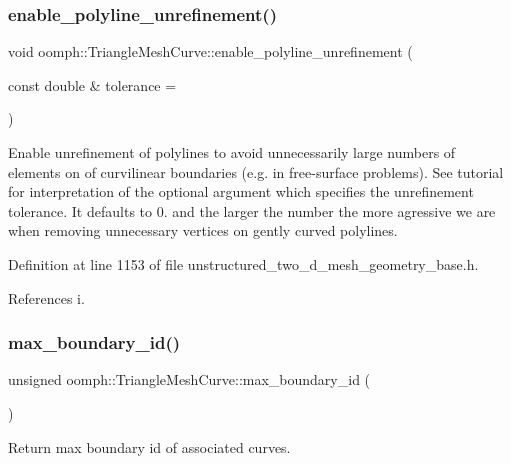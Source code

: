\subsubsection{\texorpdfstring{enable\+\_\+polyline\+\_\+unrefinement()}{enable\_polyline\_unrefinement()}}
{\footnotesize\ttfamily void oomph\+::\+Triangle\+Mesh\+Curve\+::enable\+\_\+polyline\+\_\+unrefinement (\begin{DoxyParamCaption}\item[{const double \&}]{tolerance = {} }\end{DoxyParamCaption})\hspace{0.3cm}{\ttfamily [inline]}}



Enable unrefinement of polylines to avoid unnecessarily large numbers of elements on of curvilinear boundaries (e.\+g. in free-\/surface problems). See tutorial for interpretation of the optional argument which specifies the unrefinement tolerance. It defaults to 0. and the larger the number the more agressive we are when removing unnecessary vertices on gently curved polylines. 



Definition at line 1153 of file unstructured\+\_\+two\+\_\+d\+\_\+mesh\+\_\+geometry\+\_\+base.\+h.



References i.

\mbox{\label{classoomph_1_1TriangleMeshCurve_ad5094b69c9f72db4b079d71c3c9f1ea8}} 
\subsubsection{\texorpdfstring{max\+\_\+boundary\+\_\+id()}{max\_boundary\_id()}}
{\footnotesize\ttfamily unsigned oomph\+::\+Triangle\+Mesh\+Curve\+::max\+\_\+boundary\+\_\+id (\begin{DoxyParamCaption}{ }\end{DoxyParamCaption})\hspace{0.3cm}{\ttfamily [inline]}}



Return max boundary id of associated curves. 



